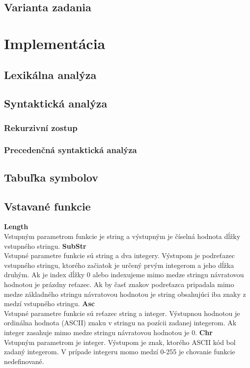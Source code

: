 \documentclass{article}
\begin{document}
        \subsection{Varianta zadania}
    
    \section{Implementácia}
    
        \subsection{Lexikálna analýza}
        
        \subsection{Syntaktická analýza}
            \subsubsection{Rekurzivní zostup}
            \subsubsection{Precedenčná syntaktická analýza}
    
        \subsection{Tabuľka symbolov}
        
        \subsection{Vstavané funkcie}
            \noindent
            \textbf{Length}\\
            Vstupným parametrom funkcie je string a výstupným je číselná hodnota dĺžky vstupného stringu.
            \textbf{SubStr}\\
            Vstupné parametre funkcie sú string  a dva integery. Výstupom je podreťazec vstupného
            stringu, ktorého začiatok je určený prvým integerom a jeho dĺžka druhým. Ak je index dĺžky
            0 alebo indexujeme mimo medze stringu návratovou hodnotou je prázdny reťazec. Ak by časť 
            znakov podreťazca pripadala mimo medze základného stringu návratovou hodnotou je string
            obsahujúci iba znaky z medzí vstupného stringu.
            \textbf{Asc}\\
            Vstupné parametre funkcie sú reťazec string a integer. Výstupnou hodnotou je ordinálna
            hodnota (ASCII) znaku v stringu na pozícii zadanej integerom. Ak integer zasahuje mimo 
            medze stringu návratovou hodnotou je 0.
            \textbf{Chr}\\
            Vstupným parametrom je integer. Výstupom je znak, ktorého ASCII kód bol zadaný integerom.
            V prípade integeru momo medzí 0-255 je chovanie funkcie nedefinované.
            
\end{document}
